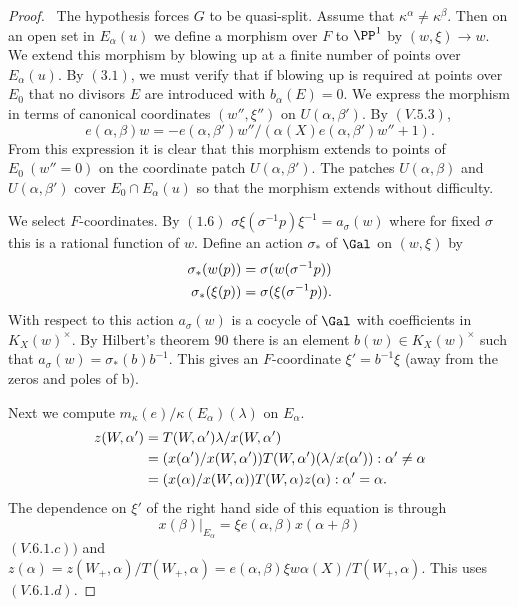 \documentclass{memo-l}
\theoremstyle{definition}
\theoremstyle{remark}
\numberwithin{section}{chapter}
\numberwithin{equation}{chapter}
\begin{document}
\begin{proof} \ The hypothesis forces $G$ to be quasi-split.  Assume
that ${\kappa}^{{\alpha}} \ne {\kappa}^{{\beta}}$.  Then on an open set in
$E_{{\alpha}}(u)$ we define a morphism over $F$ to ${\PP}^{1}$ by
$(w,{\xi}) {\to} w$.  We extend this morphism by blowing up at a finite
number of points over $E_{{\alpha}}(u)$.  By $(3.1)$, we must verify that
if blowing up is required at points over $E_{0}$ that no divisors $E$ are
introduced with $b_{{\alpha}}(E)  =  0$.  We express the morphism in terms of
canonical coordinates $(w'',{\xi}'')$ on $U({\alpha},{\beta}')$.  By $(V.5.3)$,
$$
e({\alpha},{\beta})w  =
-e({\alpha},{\beta}')w''/({\alpha}(X)e({\alpha},{\beta}')w''+1).
$$
From this expression it is clear that this morphism extends to points of
$E_{0} \ (w'' = 0)$ on the coordinate patch $U({\alpha},{\beta}')$.  The patches
$U({\alpha},{\beta})$ and $U({\alpha},{\beta}')$ cover $E_{0}  \cap
E_{{\alpha}}(u)$ so that the morphism extends without difficulty.

   We select $F$-coordinates.  By $(1.6)$\quad
${\sigma}{\xi}({\sigma}^{-1}p){\xi}^{-1}  =  a_{{\sigma}}(w)$ where for fixed
${\sigma}$ this is a rational function of $w$.  Define an action
${\sigma}_{*}$ of $\Gal$ on $(w,{\xi})$ by
$$
\aligned
{\sigma}_{*}(w(p))  &=  {\sigma}(w({\sigma}^{-1}p)) \\
{\sigma}_{*}({\xi}(p))  &=  {\sigma}({\xi}({\sigma}^{-1}p)) .
\endaligned
$$
With respect to this action $a_{{\sigma}}(w)$ is a cocycle of $\Gal$
with coefficients in $K_X(w)^{\times}$.  By Hilbert's theorem $90$ there
is an element $b(w)  \in  K_X(w)^{\times}$ such that $a_{{\sigma}}(w)  =
{\sigma}_{*}(b)b^{-1}$.  This gives an $F$-coordinate ${\xi}' = b^{-1}{\xi}$
(away from the zeros and poles of b).

   Next we compute $m_{{\kappa}}(e)/{\kappa}(E_{{\alpha}})({\lambda})$ on
$E_{{\alpha}}$.
$$
\aligned
z(W,{\alpha}')  &= T(W,{\alpha}'){\lambda}/x(W,{\alpha}')  \\
		&= (x({\alpha}')/x(W,{\alpha}'))T(W,{\alpha}')({\lambda}/x({\alpha}')) :
{\alpha}' \ne {\alpha} \\
		&=  (x({\alpha})/x(W,{\alpha}))T(W,{\alpha})z({\alpha}) :
{\alpha}' = {\alpha} .
\endaligned
$$
The dependence on ${\xi}'$ of the right hand side of this equation is
through $$x({\beta})\vert _{E_\alpha}  =
{\xi}e({\alpha},{\beta})x({\alpha}+{\beta})$$ $(V.6.1.c))$ and $z({\alpha})  =
z(W_{+},{\alpha})/T(W_{+},{\alpha})  =
e({\alpha},{\beta}){\xi}w{\alpha}(X)/T(W_{+},{\alpha})$.  This
uses $(V.6.1.d)$.


\end{proof}
\end{document}
